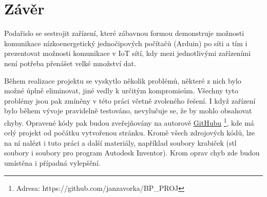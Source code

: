 \section{Závěr}
Podařislo se sestrojit zařízení, které zábavnou formou demonstruje možnosti komunikace nízkoenergetický jednočipových počítačů (Arduin) po síti a tím i prezentovat možnosti komunikace v IoT sítí, kdy mezi jednotlivými zařízeními není potřeba přenášet velké množství dat.

Během realizace projektu se vyskytlo několik problémů, některé z nich bylo možné úplně eliminovat, jiné vedly k určitým kompromisům. Všechny tyto problémy jsou pak zmíněny v této práci včetně zvoleného řešení. I když zařízení bylo během vývoje pravidelně testováno, nevylučuje se, že by mohlo obsahovat chyby. Opravené kódy pak budou zveřejňovány na autorově \href{https://github.com/janzavorka/BP_PROJ}{GitHubu} \footnote{Adresa: https://github.com/janzavorka/BP\_PROJ}, kde má celý projekt od počátku vytvořenou stránku. Kromě všech zdrojových kódů, lze na ní nalézt i tuto práci a další materiály, například soubory krabiček (stl soubory i soubory pro program Autodesk Inventor). Krom oprav chyb zde budou umístěna i případná vylepšění.
